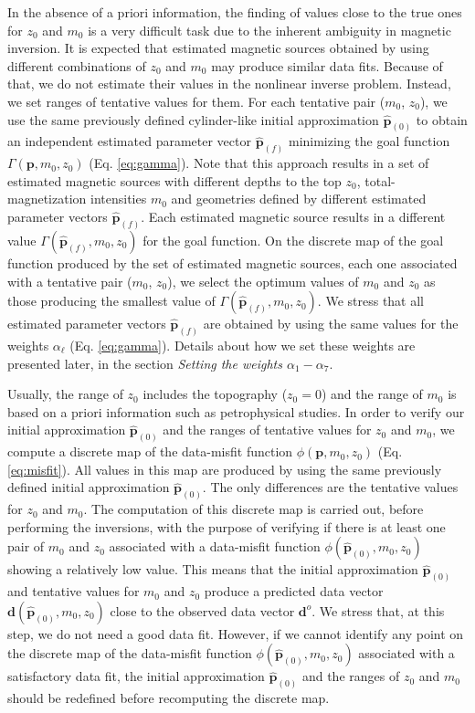 In the absence of a priori information, the finding of values close to the true ones
for $z_0$ and $m_0$ is a very difficult task due to the inherent ambiguity
in magnetic inversion. It is expected that estimated magnetic sources obtained by
using different combinations of $z_0$ and $m_0$ may produce similar data fits.
Because of that, we do not estimate their values in the nonlinear inverse problem.
Instead, we set ranges of tentative values for them.
For each tentative pair ($m_0$, $z_0$), we use the same previously defined 
cylinder-like initial approximation $\hat{\mathbf{p}}_{(0)}$ to 
obtain an independent estimated parameter vector $\hat{\mathbf{p}}_{(f)}$ 
minimizing the goal function $\Gamma (\mathbf{p}, m_{0}, z_{0})$ 
(Eq. \ref{eq:gamma}).
Note that this approach results in a set of estimated magnetic sources with
different depths to the top $z_0$, total-magnetization intensities $m_0$ and 
geometries defined by different estimated parameter vectors $\hat{\mathbf{p}}_{(f)}$.
Each estimated magnetic source results in a different value 
$\Gamma (\hat{\mathbf{p}}_{(f)}, m_{0}, z_{0})$ for the goal function.
On the discrete map of the goal function produced by the set of estimated magnetic
sources, each one associated with a tentative pair ($m_0$, $z_0$), 
we select the optimum values of $m_{0}$ and $z_{0}$ as those producing the smallest
value of $\Gamma (\hat{\mathbf{p}}_{(f)}, m_{0}, z_{0})$. 
We stress that all estimated parameter vectors $\hat{\mathbf{p}}_{(f)}$ are obtained
by using the same values for the weights $\alpha_{\ell}$ (Eq. \ref{eq:gamma}).
Details about how we set these weights are presented later, in the section
\textit{Setting the weights $\alpha_{1}-\alpha_{7}$}.

Usually, the range of $z_0$ includes the topography ($z_0 = 0$) and the range of 
$m_0$ is based on a priori information such as petrophysical studies.
In order to verify our initial approximation $\hat{\mathbf{p}}_{(0)}$ and the
ranges of tentative values for $z_0$ and $m_0$, we compute a discrete map
of the data-misfit function $\phi (\mathbf{p}, m_{0}, z_{0})$ (Eq. \ref{eq:misfit}).
All values in this map are produced by using the same previously defined 
initial approximation $\hat{\mathbf{p}}_{(0)}$. The only differences are the 
tentative values for $z_0$ and $m_0$. 
The computation of this discrete map is carried out, before performing the 
inversions, with the purpose of verifying if there is at least one pair of $ m_0 $ and $ z_0 $ 
associated with a data-misfit function $\phi (\hat{\mathbf{p}}_{(0)}, m_{0}, z_{0})$ 
showing a relatively low value. This means that the initial approximation $\hat{\mathbf{p}}_{(0)}$
and tentative values for $m_{0}$ and $z_{0}$ produce a predicted data vector 
$\mathbf{d}(\hat{\mathbf{p}}_{(0)}, m_{0}, z_{0})$ close to the observed 
data vector $\mathbf{d}^{o}$.
We stress that, at this step, we do not need a good data fit.
However, if we cannot identify any point on the discrete map of the data-misfit function 
$\phi (\hat{\mathbf{p}}_{(0)}, m_{0}, z_{0})$ associated with a satisfactory
data fit, the initial approximation $\hat{\mathbf{p}}_{(0)}$ 
and the ranges of $ z_0 $ and $ m_0 $ should be redefined before recomputing the discrete map.

